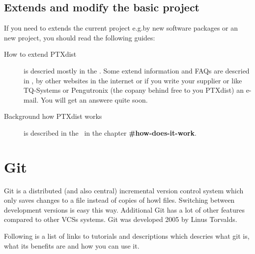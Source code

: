 \subsection{Extends and modify the basic project }%
\label{sub:extends_project}

If you need to extends the current project e.g.\@ by new software packages or an
new project, you should read the following guides:
\begin{description}
    \item[How to extend PTXdist] is descried mostly in the
        \textbf{\cite[developer guide]{ptxdist_developer}}. Some extend
        information and \glspl{FAQ} are descried in
        \textbf{\cite{ptxdist_workflows}}, by other websites in the internet
        or if you write your supplier or like TQ-Systems or Pengutronix (the
        copany behind free to you PTXdist) an e-mail. You will get an answere
        quite soon.

    \item[Background how PTXdist works] is described in the~\cite[PTXdist Users
        Manual]{ptxdist_manual} in the chapter \textbf{\#how-does-it-work}.
\end{description}


\section{Git}%
\label{sec:git}
Git is a distributed (and also central) incremental version control system which
only saves changes to a file instead of copies of howl files. Switching between
development versions is easy this way. Additional Git has a lot of other
features compared to other \glspl{VCS} systems. Git was developed 2005 by Linus
Torvalds.

Following is a list of links to tutorials and descriptions which descries what
git is, what its benefits are and how you can use it.

